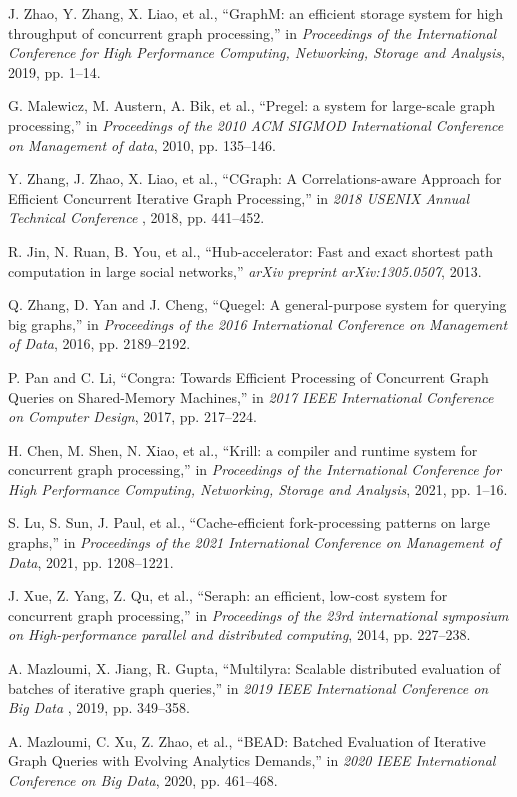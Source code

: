 \documentclass[lettersize,journal]{IEEEtran}
\begin{document}
\begin{thebibliography}{100}
J. Zhao, Y. Zhang, X. Liao, et al., ``GraphM: an efficient storage system for high throughput of concurrent graph processing,'' in \textit{Proceedings of the International Conference for High Performance Computing, Networking, Storage and Analysis}, 2019, pp. 1--14.

G. Malewicz, M. Austern, A. Bik, et al., ``Pregel: a system for large-scale graph processing,'' in \textit{Proceedings of the 2010 ACM SIGMOD International Conference on Management of data}, 2010, pp. 135--146.

Y. Zhang, J. Zhao, X. Liao, et al., ``{CGraph}: A Correlations-aware Approach for Efficient Concurrent Iterative Graph Processing,'' in \textit{2018 USENIX Annual Technical Conference }, 2018, pp. 441--452.

R. Jin, N. Ruan, B. You, et al., ``Hub-accelerator: Fast and exact shortest path computation in large social networks,'' \textit{arXiv preprint arXiv:1305.0507}, 2013.

Q. Zhang, D. Yan and J. Cheng, ``Quegel: A general-purpose system for querying big graphs,'' in \textit{Proceedings of the 2016 International Conference on Management of Data}, 2016, pp. 2189--2192.

P. Pan and C. Li, ``Congra: Towards Efficient Processing of Concurrent Graph Queries on Shared-Memory Machines,'' in \textit{2017 IEEE International Conference on Computer Design}, 2017, pp. 217--224.

H. Chen, M. Shen, N. Xiao, et al., ``Krill: a compiler and runtime system for concurrent graph processing,'' in \textit{Proceedings of the International Conference for High Performance Computing, Networking, Storage and Analysis}, 2021, pp. 1--16.

S. Lu, S. Sun, J. Paul, et al., ``Cache-efficient fork-processing patterns on large graphs,'' in \textit{Proceedings of the 2021 International Conference on Management of Data}, 2021, pp. 1208--1221.

J. Xue, Z. Yang, Z. Qu, et al., ``Seraph: an efficient, low-cost system for concurrent graph processing,'' in \textit{Proceedings of the 23rd international symposium on High-performance parallel and distributed computing}, 2014, pp. 227--238.

A. Mazloumi, X. Jiang, R. Gupta, ``Multilyra: Scalable distributed evaluation of batches of iterative graph queries,'' in \textit{2019 IEEE International Conference on Big Data }, 2019, pp. 349--358.

A. Mazloumi, C. Xu, Z. Zhao, et al., ``BEAD: Batched Evaluation of Iterative Graph Queries with Evolving Analytics Demands,'' in \textit{2020 IEEE International Conference on Big Data}, 2020, pp. 461--468.




\end{thebibliography}
\end{document}

